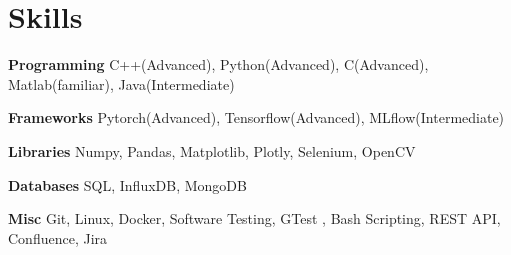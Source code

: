 
\section{Skills}
  \vspace{2pt}
  \resumeSubHeadingListStart
    \small{\item{

    \textbf{\color{MidnightBlue}Programming}{ C++(Advanced), Python(Advanced), C(Advanced), Matlab(familiar), Java(Intermediate)} \\ \vspace{3pt}

    \textbf{\color{MidnightBlue}Frameworks}{ Pytorch(Advanced), Tensorflow(Advanced), MLflow(Intermediate)}\\ \vspace{3pt}

    \textbf{\color{MidnightBlue}Libraries}{ Numpy, Pandas, Matplotlib, Plotly, Selenium, OpenCV} \\ \vspace{3pt}


    \textbf{\color{MidnightBlue}Databases}{ SQL, InfluxDB, MongoDB} \\ \vspace{3pt}

    \textbf{\color{MidnightBlue}Misc}{ Git, Linux, Docker, Software Testing, GTest , Bash Scripting, REST API, Confluence, Jira} \\ \vspace{3pt}
            
    }}
  \resumeSubHeadingListEnd
